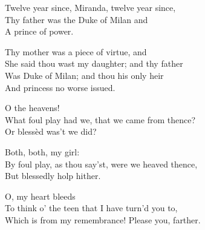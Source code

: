 \begin{verse_speech}[Prospero] 
	Twelve year since, Miranda, twelve year since,\\
Thy father was the Duke of Milan and\\
A prince of power.
\end{verse_speech}


\begin{verse_speech}[Prospero] 
Thy mother was a piece of virtue, and\\
She said thou wast my daughter; and thy father\\
Was Duke of Milan; and thou his only heir\\
And princess no worse issued.
\end{verse_speech}

\begin{verse_speech}[Miranda] 
O the heavens!\\
What foul play had we, that we came from thence?\\
Or blessèd was't we did?
\end{verse_speech}

\begin{verse_speech}[Prospero] 
Both, both, my girl:\\
By foul play, as thou say'st, were we heaved thence,\\
But blessedly holp hither.
\end{verse_speech}

\begin{verse_speech}[Miranda] 
O, my heart bleeds\\
To think o' the teen that I have turn'd you to,\\
Which is from my remembrance! Please you, farther.
\end{verse_speech}


